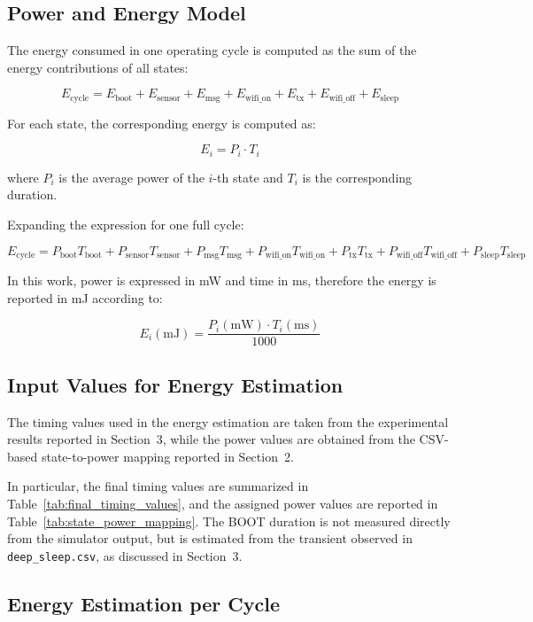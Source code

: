 \documentclass{article}
\begin{document}
\subsection{Power and Energy Model}

The energy consumed in one operating cycle is computed as the sum of the energy contributions of all states:

\[
E_{\text{cycle}} =
E_{\text{boot}} +
E_{\text{sensor}} +
E_{\text{msg}} +
E_{\text{wifi\_on}} +
E_{\text{tx}} +
E_{\text{wifi\_off}} +
E_{\text{sleep}}
\]

For each state, the corresponding energy is computed as:

\[
E_i = P_i \cdot T_i
\]

where \(P_i\) is the average power of the \(i\)-th state and \(T_i\) is the corresponding duration.

Expanding the expression for one full cycle:

\[
E_{\text{cycle}} =
P_{\text{boot}}T_{\text{boot}} +
P_{\text{sensor}}T_{\text{sensor}} +
P_{\text{msg}}T_{\text{msg}} +
P_{\text{wifi\_on}}T_{\text{wifi\_on}} +
P_{\text{tx}}T_{\text{tx}} +
P_{\text{wifi\_off}}T_{\text{wifi\_off}} +
P_{\text{sleep}}T_{\text{sleep}}
\]

In this work, power is expressed in mW and time in ms, therefore the energy is reported in mJ according to:

\[
E_i(\text{mJ}) = \frac{P_i(\text{mW}) \cdot T_i(\text{ms})}{1000}
\]

\subsection{Input Values for Energy Estimation}

The timing values used in the energy estimation are taken from the experimental results reported in Section~3, while the power values are obtained from the CSV-based state-to-power mapping reported in Section~2.

In particular, the final timing values are summarized in Table~\ref{tab:final_timing_values}, and the assigned power values are reported in Table~\ref{tab:state_power_mapping}. The BOOT duration is not measured directly from the simulator output, but is estimated from the transient observed in \texttt{deep\_sleep.csv}, as discussed in Section~3.

\subsection{Energy Estimation per Cycle}
\end{document}
